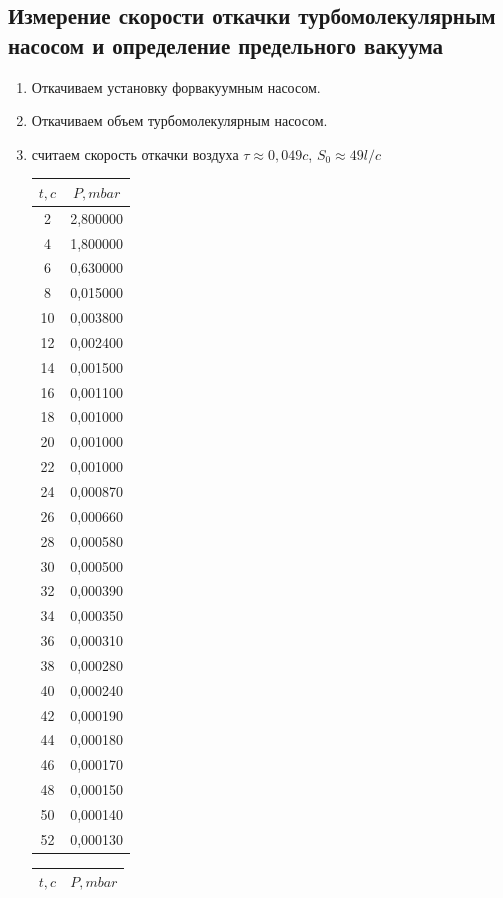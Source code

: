 \documentclass[a4paper, 12pt]{article}%
\begin{document}
\subsection*{Измерение скорости откачки турбомолекулярным насосом и определение предельного вакуума}
\begin{enumerate}
\item Откачиваем установку форвакуумным насосом.
\item Откачиваем объем турбомолекулярным насосом.
\item считаем скорость откачки воздуха $\tau \approx 0,049 c$, $S_0 \approx 49 l/c$

\begin{tabular}{|c|c|}
\hline
$t, c$ & $P, mbar$ \\ \hline
2 & 2,800000 \\ \hline
4 & 1,800000 \\ \hline
6 & 0,630000 \\ \hline
8 & 0,015000 \\ \hline
10 & 0,003800 \\ \hline
12 & 0,002400 \\ \hline
14 & 0,001500 \\ \hline
16 & 0,001100 \\ \hline
18 & 0,001000 \\ \hline
20 & 0,001000 \\ \hline
22 & 0,001000 \\ \hline
24 & 0,000870 \\ \hline
26 & 0,000660 \\ \hline
28 & 0,000580 \\ \hline
30 & 0,000500 \\ \hline
32 & 0,000390 \\ \hline
34 & 0,000350 \\ \hline
36 & 0,000310 \\ \hline
38 & 0,000280 \\ \hline
40 & 0,000240 \\ \hline
42 & 0,000190 \\ \hline
44 & 0,000180 \\ \hline
46 & 0,000170 \\ \hline
48 & 0,000150 \\ \hline
50 & 0,000140 \\ \hline
52 & 0,000130 \\ \hline
\end{tabular}
\begin{tabular}{|c|c|}
\hline
$t, c$ & $P, mbar$ \\ \hline

\end{tabular}
\end{enumerate}
\end{document}
